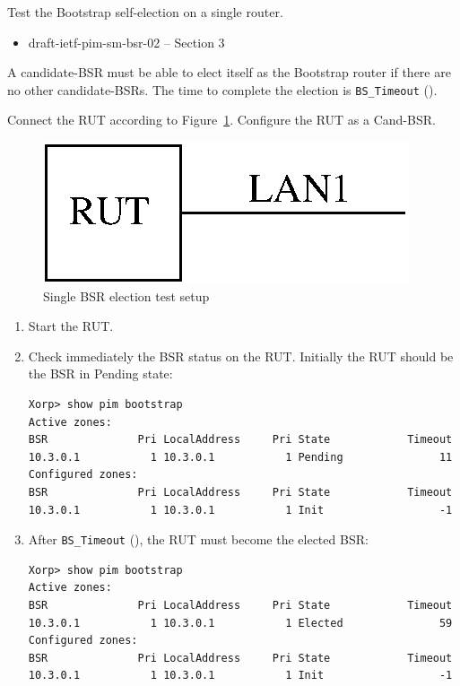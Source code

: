 \documentclass[11pt]{report}
\begin{document}
Test the Bootstrap self-election on a single router.

\begin{itemize}
  \item draft-ietf-pim-sm-bsr-02 -- Section 3
\end{itemize}

A candidate-BSR must be able to elect itself as the
Bootstrap router if there are no other candidate-BSRs. The time to complete
the election is \verb=BS_Timeout= ({\PimsmBSTimeout}).

Connect the RUT according to Figure~\ref{fig:single_bsr_election}.
Configure the RUT as a Cand-BSR.

\begin{figure}[htbp]
  \begin{center}
    \includegraphics[scale=0.8]{figs/pim_test_6_1_single_bsr_election}
    \caption{Single BSR election test setup}
    \label{fig:single_bsr_election}
  \end{center}
\end{figure}

\begin{enumerate}

  \item Start the RUT.

  \item Check immediately the BSR status on the RUT. Initially the RUT should
        be the BSR in Pending state:

\begin{verbatim}
Xorp> show pim bootstrap
Active zones:
BSR              Pri LocalAddress     Pri State            Timeout
10.3.0.1           1 10.3.0.1           1 Pending               11
Configured zones:
BSR              Pri LocalAddress     Pri State            Timeout
10.3.0.1           1 10.3.0.1           1 Init                  -1
\end{verbatim}

  \item After \verb=BS_Timeout= ({\PimsmBSTimeout}), the RUT must become the
        elected BSR:

\begin{verbatim}
Xorp> show pim bootstrap
Active zones:
BSR              Pri LocalAddress     Pri State            Timeout
10.3.0.1           1 10.3.0.1           1 Elected               59
Configured zones:
BSR              Pri LocalAddress     Pri State            Timeout
10.3.0.1           1 10.3.0.1           1 Init                  -1
\end{verbatim}

\end{enumerate}
\end{document}
